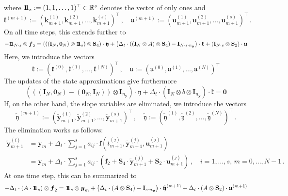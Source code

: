 \documentclass{article}
\newcommand{\defeq}{\mathrel{:=}}%
\newcommand{\tp}{\top}%
\newcommand{\kron}{\otimes}%
\newcommand{\setR}{\mathbb{R}}%
\newcommand{\vectorfont}[1]{\boldsymbol{#1}}%
\newcommand{\greekvectorfont}[1]{\boldsymbol{#1}}%
\newcommand{\matrixfont}[1]{\mathbf{#1}}%
\newcommand{\fvec}{\vectorfont{f}}
\newcommand{\kvec}{\vectorfont{k}}
\newcommand{\uvec}{\vectorfont{u}}
\newcommand{\yvec}{\vectorfont{y}}
\newcommand{\tildeyvec}{\vectorfont{\tilde{y}}}
\newcommand{\kfrakvec}{\vectorfont{\mathfrak{k}}}
\newcommand{\ufrakvec}{\vectorfont{\mathfrak{u}}}
\newcommand{\yfrakvec}{\vectorfont{\mathfrak{y}}}
\newcommand{\tildeyfrakvec}{\vectorfont{\tilde{\mathfrak{y}}}}
\newcommand{\nullvec}{\greekvectorfont{0}}
\newcommand{\einsvec}{\vectorfont{1}\negthinspace\negthinspace\vectorfont{1}} %
\newcommand{\Imat}{\matrixfont{I}}%
\newcommand{\Smat}{\matrixfont{S}}
\begin{document}
where $\einsvec_s \defeq (1,1,\ldots,1)^{\tp} \in \setR^s$ denotes the vector of only ones and
\begin{equation*}
\kfrakvec^{(m+1)} \defeq (\kvec_{m+1}^{(1)}, \kvec_{m+1}^{(2)}, \ldots, \kvec_{m+1}^{(s)})^{\tp}\,,
\quad
\ufrakvec^{(m+1)} \defeq (\uvec_{m+1}^{(1)}, \uvec_{m+1}^{(2)}, \ldots, \uvec_{m+1}^{(s)})^{\tp}\,.
\end{equation*}
On all time steps, this extends further to
\[
-\einsvec_{N\cdot s}\kron \fvec_2
 = \left(((\Imat_N ,\nullvec_N)\kron \einsvec_s) \kron \Smat_4 \right) \cdot \yfrakvec
  + \left( \Delta_t \cdot ((\Imat_N \kron A)\kron \Smat_4) - \Imat_{N\cdot s \cdot n_{\yvec}}\right)\cdot \kfrakvec  + (\Imat_{N\cdot s}\kron \Smat_2) \cdot \ufrakvec
\]
Here, we introduce the vectors
\[
\kfrakvec \defeq (\kfrakvec^{(0)}, \kfrakvec^{(1)}, \ldots , \kfrakvec^{(N)})^{\tp}\,,\quad
\ufrakvec \defeq (\ufrakvec^{(0)}, \ufrakvec^{(1)}, \ldots , \ufrakvec^{(N)})^{\tp}
\]
The updates of the state approximations give furthermore 
\[
\left(
((\Imat_N, \nullvec_N) - (\nullvec_N, \Imat_N)) \kron \Imat_{n_{\yvec}}
\right) \cdot \yfrakvec 
+ \Delta_t \cdot  (\Imat_N \kron b \kron \Imat_{n_{\yvec}}) \cdot \kfrakvec = \nullvec
\]
If, on the other hand, the slope variables are eliminated, we introduce the vectors
\[
\tildeyfrakvec^{(m+1)} \defeq (\tildeyvec_{m+1}^{(1)}, \tildeyvec_{m+1}^{(2)}, \ldots, \tildeyvec_{m+1}^{(s)})^{\tp}\,,
\quad
\tildeyfrakvec \defeq (\tildeyfrakvec^{(1)}, \tildeyfrakvec^{(2)}, \ldots, \tildeyfrakvec^{(N)})^{\tp}\,.
\]
The elimination works as follows:
\begin{align*}
\tildeyvec_{m+1}^{(i)} &= \yvec_m + \Delta_t \cdot \sum_{j=1}^s a_{ij} \cdot \fvec(t_{m+1}^{(j)}, \tildeyvec_{m+1}^{(j)}, \uvec_{m+1}^{(j)})
\\
 &= \yvec_m + \Delta_t \cdot \sum_{j=1}^s a_{ij} \cdot \left( \fvec_2  + \Smat_4 \cdot \tildeyvec_{m+1}^{(j)} + \Smat_2 \cdot \uvec_{m+1}^{(j)}\right)\,,\quad i = 1 ,\ldots,s,\, m = 0,\ldots, N-1\,.
\end{align*}
At one time step, this can be summarized to
\[
-\Delta_t \cdot (A\cdot \einsvec_s) \kron \fvec_2 
 = \einsvec_s \kron \yvec_m + \left( \Delta_t \cdot (A \kron \Smat_4) - \Imat_{s \cdot n_{\yvec}} \right)\cdot \tildeyfrakvec^{(m+1)} + \Delta_t \cdot (A \kron \Smat_2) \cdot \ufrakvec^{(m+1)}
\]
\end{document}
